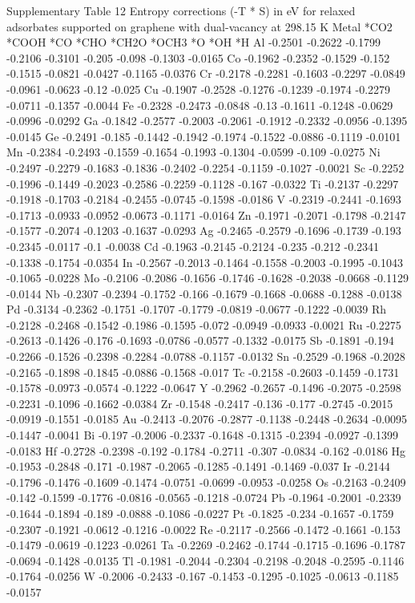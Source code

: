 Supplementary Table 12
Entropy corrections (-T * S) in eV for relaxed adsorbates supported on graphene with dual-vacancy at 298.15 K
Metal	*CO2	*COOH	*CO	*CHO	*CH2O	*OCH3	*O	*OH	*H
Al	-0.2501	-0.2622	-0.1799	-0.2106	-0.3101	-0.205	-0.098	-0.1303	-0.0165
Co	-0.1962	-0.2352	-0.1529	-0.152	-0.1515	-0.0821	-0.0427	-0.1165	-0.0376
Cr	-0.2178	-0.2281	-0.1603	-0.2297	-0.0849	-0.0961	-0.0623	-0.12	-0.025
Cu	-0.1907	-0.2528	-0.1276	-0.1239	-0.1974	-0.2279	-0.0711	-0.1357	-0.0044
Fe	-0.2328	-0.2473	-0.0848	-0.13	-0.1611	-0.1248	-0.0629	-0.0996	-0.0292
Ga	-0.1842	-0.2577	-0.2003	-0.2061	-0.1912	-0.2332	-0.0956	-0.1395	-0.0145
Ge	-0.2491	-0.185	-0.1442	-0.1942	-0.1974	-0.1522	-0.0886	-0.1119	-0.0101
Mn	-0.2384	-0.2493	-0.1559	-0.1654	-0.1993	-0.1304	-0.0599	-0.109	-0.0275
Ni	-0.2497	-0.2279	-0.1683	-0.1836	-0.2402	-0.2254	-0.1159	-0.1027	-0.0021
Sc	-0.2252	-0.1996	-0.1449	-0.2023	-0.2586	-0.2259	-0.1128	-0.167	-0.0322
Ti	-0.2137	-0.2297	-0.1918	-0.1703	-0.2184	-0.2455	-0.0745	-0.1598	-0.0186
V	-0.2319	-0.2441	-0.1693	-0.1713	-0.0933	-0.0952	-0.0673	-0.1171	-0.0164
Zn	-0.1971	-0.2071	-0.1798	-0.2147	-0.1577	-0.2074	-0.1203	-0.1637	-0.0293
Ag	-0.2465	-0.2579	-0.1696	-0.1739	-0.193	-0.2345	-0.0117	-0.1	-0.0038
Cd	-0.1963	-0.2145	-0.2124	-0.235	-0.212	-0.2341	-0.1338	-0.1754	-0.0354
In	-0.2567	-0.2013	-0.1464	-0.1558	-0.2003	-0.1995	-0.1043	-0.1065	-0.0228
Mo	-0.2106	-0.2086	-0.1656	-0.1746	-0.1628	-0.2038	-0.0668	-0.1129	-0.0144
Nb	-0.2307	-0.2394	-0.1752	-0.166	-0.1679	-0.1668	-0.0688	-0.1288	-0.0138
Pd	-0.3134	-0.2362	-0.1751	-0.1707	-0.1779	-0.0819	-0.0677	-0.1222	-0.0039
Rh	-0.2128	-0.2468	-0.1542	-0.1986	-0.1595	-0.072	-0.0949	-0.0933	-0.0021
Ru	-0.2275	-0.2613	-0.1426	-0.176	-0.1693	-0.0786	-0.0577	-0.1332	-0.0175
Sb	-0.1891	-0.194	-0.2266	-0.1526	-0.2398	-0.2284	-0.0788	-0.1157	-0.0132
Sn	-0.2529	-0.1968	-0.2028	-0.2165	-0.1898	-0.1845	-0.0886	-0.1568	-0.017
Tc	-0.2158	-0.2603	-0.1459	-0.1731	-0.1578	-0.0973	-0.0574	-0.1222	-0.0647
Y	-0.2962	-0.2657	-0.1496	-0.2075	-0.2598	-0.2231	-0.1096	-0.1662	-0.0384
Zr	-0.1548	-0.2417	-0.136	-0.177	-0.2745	-0.2015	-0.0919	-0.1551	-0.0185
Au	-0.2413	-0.2076	-0.2877	-0.1138	-0.2448	-0.2634	-0.0095	-0.1447	-0.0041
Bi	-0.197	-0.2006	-0.2337	-0.1648	-0.1315	-0.2394	-0.0927	-0.1399	-0.0183
Hf	-0.2728	-0.2398	-0.192	-0.1784	-0.2711	-0.307	-0.0834	-0.162	-0.0186
Hg	-0.1953	-0.2848	-0.171	-0.1987	-0.2065	-0.1285	-0.1491	-0.1469	-0.037
Ir	-0.2144	-0.1796	-0.1476	-0.1609	-0.1474	-0.0751	-0.0699	-0.0953	-0.0258
Os	-0.2163	-0.2409	-0.142	-0.1599	-0.1776	-0.0816	-0.0565	-0.1218	-0.0724
Pb	-0.1964	-0.2001	-0.2339	-0.1644	-0.1894	-0.189	-0.0888	-0.1086	-0.0227
Pt	-0.1825	-0.234	-0.1657	-0.1759	-0.2307	-0.1921	-0.0612	-0.1216	-0.0022
Re	-0.2117	-0.2566	-0.1472	-0.1661	-0.153	-0.1479	-0.0619	-0.1223	-0.0261
Ta	-0.2269	-0.2462	-0.1744	-0.1715	-0.1696	-0.1787	-0.0694	-0.1428	-0.0135
Tl	-0.1981	-0.2044	-0.2304	-0.2198	-0.2048	-0.2595	-0.1146	-0.1764	-0.0256
W	-0.2006	-0.2433	-0.167	-0.1453	-0.1295	-0.1025	-0.0613	-0.1185	-0.0157


